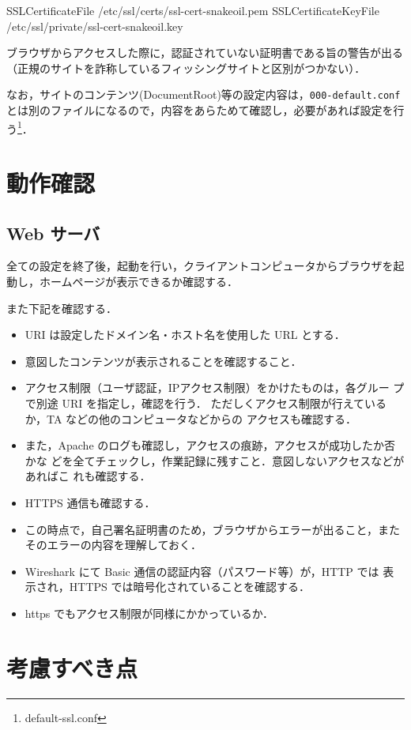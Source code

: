 \begin{cli}
 SSLCertificateFile /etc/ssl/certs/ssl-cert-snakeoil.pem
 SSLCertificateKeyFile /etc/ssl/private/ssl-cert-snakeoil.key
\end{cli}

ブラウザからアクセスした際に，認証されていない証明書である旨の警告が出る
（正規のサイトを詐称しているフィッシングサイトと区別がつかない）．

なお，サイトのコンテンツ(DocumentRoot)等の設定内容は，\texttt{000-default.conf}とは別のファイルになるので，内容をあらためて確認し，必要があれば設定を行う\footnote{default-ssl.conf}．


\section{動作確認}

\subsection*{Web サーバ}

全ての設定を終了後，起動を行い，クライアントコンピュータからブラウザを起
動し，ホームページが表示できるか確認する．

また下記を確認する．
\begin{itemize}
 \item URI は設定したドメイン名・ホスト名を使用した URL とする．
 \item 意図したコンテンツが表示されることを確認すること．
 \item アクセス制限（ユーザ認証，IPアクセス制限）をかけたものは，各グルー
       プで別途 URI を指定し，確認を行う．
 ただしくアクセス制限が行えているか，TA などの他のコンピュータなどからの
 アクセスも確認する．
 \item  また，Apache のログも確認し，アクセスの痕跡，アクセスが成功したか否かな
 どを全てチェックし，作業記録に残すこと．意図しないアクセスなどがあればこ
 れも確認する．
 \item HTTPS 通信も確認する．
 \item この時点で，自己署名証明書のため，ブラウザからエラーが出ること，またそのエラーの内容を理解しておく．
  \item Wireshark にて Basic 通信の認証内容（パスワード等）が，HTTP では
       表示され，HTTPS では暗号化されていることを確認する．
\item https でもアクセス制限が同様にかかっているか．
\end{itemize}

\section{考慮すべき点}

